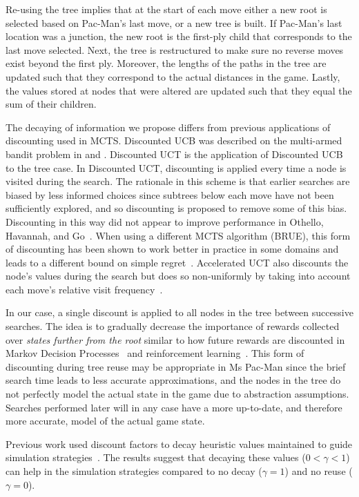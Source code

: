 \documentclass[journal]{IEEEtran}
\begin{document}
Re-using the tree implies that at the start of each move either a new root is selected based on Pac-Man's last move, or a new tree is built. If Pac-Man's last location was a junction, the new root is the first-ply child that corresponds to the last move selected. Next, the tree is restructured to make sure no reverse moves exist beyond the first ply. Moreover, the lengths of the paths in the tree are updated such that they correspond to the actual distances in the game. Lastly, the values stored at nodes that were altered are updated such that they equal the sum of their children.

The decaying of information we propose differs from previous applications of discounting used in MCTS. Discounted UCB was described on the multi-armed bandit problem in \cite{Kocsis06ducb} and \cite{Garivier11On}. Discounted UCT is the application of Discounted UCB to the tree case. In Discounted UCT, discounting is applied every time a node is visited during the search. The rationale in this scheme is that earlier searches are biased by less informed choices since subtrees below each move have not been sufficiently explored, and so discounting is proposed to remove some of this bias. Discounting in this way did not appear to improve performance in Othello, Havannah, and  Go~\cite{Hashimoto12Accelerated}. When using a different MCTS algorithm (BRUE), this form of discounting has been shown to work better in practice in some domains and leads to a different bound on simple regret~\cite{Feldman12Simple}. Accelerated UCT also discounts the node's values during the search but does so non-uniformly by taking into account each move's relative visit frequency~\cite{Hashimoto12Accelerated}. 

In our case, a single discount is applied to all nodes in the tree between successive searches. The idea is to gradually decrease the importance of rewards collected over {\it states further from the root} similar to how future rewards are discounted in Markov Decision Processes~\cite{Bertsekas12MDPbook} and reinforcement learning~\cite{sutton1998reinforcement}. This form of discounting during tree reuse may be appropriate in Ms Pac-Man since the brief search time leads to less accurate approximations, and the nodes in the tree do not perfectly model the actual state in the game due to abstraction assumptions. Searches performed later will in any case have a more up-to-date, and therefore more accurate, model of the actual game state.

Previous work used discount factors to decay heuristic values maintained to guide simulation strategies~\cite{tak13decaying}. The results suggest that decaying these values ($0 < \gamma < 1$) can help in the simulation strategies compared to no decay ($\gamma = 1$) and no reuse ($\gamma = 0$).
\end{document}
